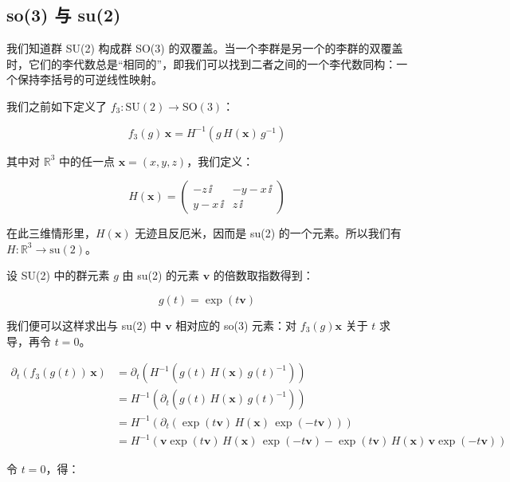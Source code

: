 \subsection{so(3) 与 su(2)}

我们知道群 SU(2) 构成群 SO(3) 的双覆盖。当一个李群是另一个的李群的双覆盖时，它们的李代数总是“相同的”，即我们可以找到二者之间的一个李代数同构：一个保持李括号的可逆线性映射。

我们之前如下定义了 $f_3:\mathrm{SU}(2)\to\mathrm{SO}(3)$：

\begin{equation}
f_3(g)\,\mathbf{x} = H^{-1}\!\left(g\,H(\mathbf{x})\,g^{-1}\right)
\end{equation}

其中对 $\mathbb{R}^{3}$ 中的任一点 $\mathbf{x}=(x,y,z)$，我们定义：

\begin{equation}
H(\mathbf{x}) = \begin{pmatrix}
-z\,\ii & -y - x\,\ii \\
y - x\,\ii & z\,\ii
\end{pmatrix}
\end{equation}

在此三维情形里，$H(\mathbf{x})$ 无迹且反厄米，因而是 su(2) 的一个元素。所以我们有 $H:\mathbb{R}^{3}\to\mathrm{su}(2)$。

设 SU(2) 中的群元素 $g$ 由 su(2) 的元素 $\mathbf{v}$ 的倍数取指数得到：

\begin{equation}
g(t) = \exp(t\mathbf{v})
\end{equation}

我们便可以这样求出与 su(2) 中 $\mathbf{v}$ 相对应的 so(3) 元素：对 $f_3(g)\mathbf{x}$ 关于 $t$ 求导，再令 $t=0$。

\begin{align}
\partial_t\!\left(f_3(g(t))\,\mathbf{x}\right)
&= \partial_t\!\left(H^{-1}\!\left(g(t)\,H(\mathbf{x})\,g(t)^{-1}\right)\right) \\
&= H^{-1}\!\left(\partial_t\!\left(g(t)\,H(\mathbf{x})\,g(t)^{-1}\right)\right) \\
&= H^{-1}\!\left(\partial_t\!\left(\exp(t\mathbf{v})\,H(\mathbf{x})\,\exp(-t\mathbf{v})\right)\right) \\
&= H^{-1}\!\left(\mathbf{v}\exp(t\mathbf{v})\,H(\mathbf{x})\,\exp(-t\mathbf{v}) - \exp(t\mathbf{v})\,H(\mathbf{x})\,\mathbf{v}\exp(-t\mathbf{v})\right)
\end{align}

令 $t=0$，得：

